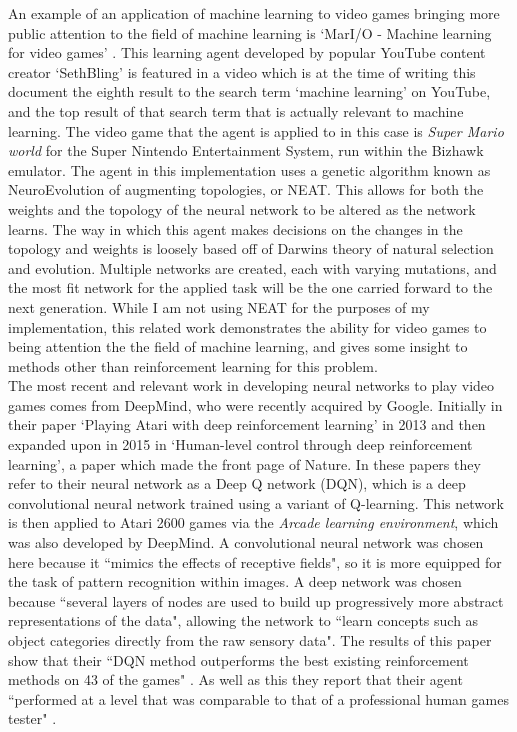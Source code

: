 \documentclass[10pt]{article}
\begin{document}
		An example of an application of machine learning to video games bringing more public attention to the field of machine learning is `MarI/O - Machine learning for video games' \cite{mario}. This learning agent developed by popular YouTube content creator `SethBling' is featured in a video which is at the time of writing this document the eighth result to the search term `machine learning' on YouTube, and the top result of that search term that is actually relevant to machine learning. The video game that the agent is applied to in this case is \textit{Super Mario world} for the Super Nintendo Entertainment System, run within the Bizhawk emulator\cite{biz}. The agent in this implementation uses a genetic algorithm known as NeuroEvolution of augmenting topologies, or NEAT. This allows for both the weights and the topology of the neural network to be altered as the network learns. The way in which this agent makes decisions on the changes in the topology and weights is loosely based off of Darwins theory of natural selection and evolution. Multiple networks are created, each with varying mutations, and the most fit network for the applied task will be the one carried forward to the next generation. While I am not using NEAT for the purposes of my implementation, this related work demonstrates the ability for video games to being attention the the field of machine learning, and gives some insight to methods other than reinforcement learning for this problem.\\
		
		The most recent and relevant work in developing neural networks to play video games comes from DeepMind, who were recently acquired by Google. Initially in their paper `Playing Atari with deep reinforcement learning' in 2013 and then expanded upon in 2015 in `Human-level control through deep reinforcement learning', a paper which made the front page of Nature. In these papers they refer to their neural network as a Deep Q network (DQN), which is a deep convolutional neural network trained using a variant of Q-learning. This network is then applied to Atari 2600 games via the \textit{Arcade learning environment}, which was also developed by DeepMind. A convolutional neural network was chosen here because it ``mimics the effects of receptive fields"\cite{humanlevel}, so it is more equipped for the task of pattern recognition within images. A deep network was chosen because ``several layers of nodes are used to build up progressively more abstract representations of the data"\cite{humanlevel}, allowing the network to ``learn concepts such as object categories directly from the raw sensory data"\cite{humanlevel}. The results of this paper show that their ``DQN method outperforms the best existing reinforcement methods on 43 of the games" \cite{humanlevel}. As well as this they report that their agent ``performed at a level that was comparable to that of a professional human games tester" \cite{humanlevel}.\\
		
\end{document}
